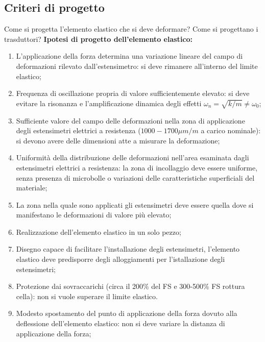 \documentclass[a4paper, 15pt]{article}
\begin{document}
\subsection{Criteri di progetto}		
\begin{adjustwidth}{2in}{}			 
		 Come si progetta l'elemento elastico che si deve deformare? Come si progettano i trasduttori? \newline 
		 \textbf{Ipotesi di progetto dell'elemento elastico:}
		 \begin{enumerate}
		 	\item L'applicazione della forza determina una variazione lineare del campo di
		 	deformazioni rilevato dall'estensimetro: si deve rimanere all'interno del limite elastico;
		 	
		 	\item Frequenza di oscillazione propria di valore sufficientemente elevato: si deve evitare la risonanza e l'amplificazione dinamica degli effetti $\omega_n=\sqrt{k/m}\ne\omega_0$;
		 	
		 	\item Sufficiente valore del campo delle deformazioni nella zona di applicazione
		 	degli estensimetri elettrici a resistenza ($ 1000-1700 \mu m/m $ a carico nominale): si devono avere delle dimensioni atte a misurare la deformazione;
		 	
		 	\item Uniformità della distribuzione delle deformazioni nell'area esaminata dagli
		 	estensimetri elettrici a resistenza: la zona di incollaggio deve essere uniforme, senza presenza di microbolle o variazioni delle caratteristiche superficiali del materiale; 
		 	
		 	\item La zona nella quale sono applicati gli estensimetri deve essere quella
		 	dove si manifestano le deformazioni di valore più elevato; 
		 	
		 	\item Realizzazione dell'elemento elastico in un solo pezzo;
		 	
		 	\item Disegno capace di facilitare l'installazione degli estensimetri, l'elemento elastico deve predisporre degli alloggiamenti per l'istallazione degli estensimetri;
		 	
		 	\item Protezione dai sovraccarichi (circa il 200\% del FS e 300-500\% FS rottura
		 	cella): non si vuole superare il limite elastico. 
		 	
		 	\item Modesto spostamento del punto di applicazione della forza dovuto alla
		 	deflessione dell'elemento elastico: non si deve variare la distanza di applicazione della forza; 
		 	

\end{enumerate}
\end{adjustwidth}
\end{document}
